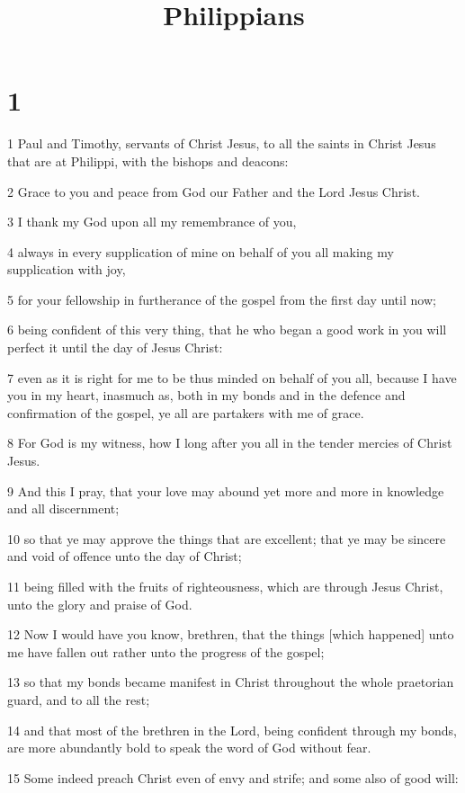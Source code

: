 

\title{Philippians}

\chapter{1}

\par 1 Paul and Timothy, servants of Christ Jesus, to all the saints in Christ Jesus that are at Philippi, with the bishops and deacons:
\par 2 Grace to you and peace from God our Father and the Lord Jesus Christ.
\par 3 I thank my God upon all my remembrance of you,
\par 4 always in every supplication of mine on behalf of you all making my supplication with joy,
\par 5 for your fellowship in furtherance of the gospel from the first day until now;
\par 6 being confident of this very thing, that he who began a good work in you will perfect it until the day of Jesus Christ:
\par 7 even as it is right for me to be thus minded on behalf of you all, because I have you in my heart, inasmuch as, both in my bonds and in the defence and confirmation of the gospel, ye all are partakers with me of grace.
\par 8 For God is my witness, how I long after you all in the tender mercies of Christ Jesus.
\par 9 And this I pray, that your love may abound yet more and more in knowledge and all discernment;
\par 10 so that ye may approve the things that are excellent; that ye may be sincere and void of offence unto the day of Christ;
\par 11 being filled with the fruits of righteousness, which are through Jesus Christ, unto the glory and praise of God.
\par 12 Now I would have you know, brethren, that the things [which happened] unto me have fallen out rather unto the progress of the gospel;
\par 13 so that my bonds became manifest in Christ throughout the whole praetorian guard, and to all the rest;
\par 14 and that most of the brethren in the Lord, being confident through my bonds, are more abundantly bold to speak the word of God without fear.
\par 15 Some indeed preach Christ even of envy and strife; and some also of good will:
